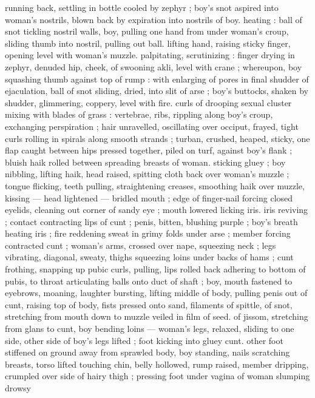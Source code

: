 {running back, settling in bottle cooled by zephyr ; boy's snot aspired 
into woman's nostrils, blown back by expiration into nostrils of boy. 
heating : ball of snot tickling nostril walls, boy, pulling one hand from 
under woman's croup, sliding thumb into nostril, pulling out ball. 
lifting hand, raising sticky finger, opening level with woman's muzzle. 
palpitating, scrutinizing : finger drying in zephyr, denuded hip, 
cheek, of swooning akli, level with crane ; whereupon, boy squashing 
thumb against top of rump : with enlarging of pores in final shudder 
of ejaculation, ball of snot sliding, dried, into slit of arse ; boy's 
buttocks, shaken by shudder, glimmering, coppery, level with fire. 
curls of drooping sexual cluster mixing with blades of grass : 
vertebrae, ribs, rippling along boy's croup, exchanging perspiration 
; hair unravelled, oscillating over occiput, frayed, tight curls rolling in 
spirals along smooth strands ; turban, crushed, heaped, sticky, one 
flap caught between hips pressed together, piled on turf, against 
boy's flank ; bluish haik rolled between spreading breasts of woman. 
sticking gluey ; boy nibbling, lifting haik, head raised, spitting cloth 
back over woman's muzzle ; tongue flicking, teeth pulling, 
straightening creases, smoothing haik over muzzle, kissing --- head 
lightened --- bridled mouth ; edge of finger-nail forcing closed 
eyelids, cleaning out corner of sandy eye ; mouth lowered licking iris. 
iris reviving ; contact contracting lips of cunt ; penis, bitten, blushing 
purple ; boy's breath heating iris ; fire reddening sweat in grimy folds 
under arse ; member forcing contracted cunt ; woman's arms, 
crossed over nape, squeezing neck ; legs vibrating, diagonal, sweaty, 
thighs squeezing loins under backs of hams ; cunt frothing, snapping 
up pubic curls, pulling, lips rolled back adhering to bottom of pubis, 
to throat articulating balls onto duct of shaft ; boy, mouth fastened 
to eyebrows, moaning, laughter bursting, lifting middle of body, 
pulling penis out of cunt, raising top of body, fists pressed onto 
sand, filaments of spittle, of snot, stretching from mouth down to 
muzzle veiled in film of seed. of jissom, stretching from glans to 
cunt, boy bending loins --- woman's legs, relaxed, sliding to one 
side, other side of boy's legs lifted ; foot kicking into gluey cunt. 
other foot stiffened on ground away from sprawled body, boy 
standing, nails scratching breasts, torso lifted touching chin, belly 
hollowed, rump raised, member dripping, crumpled over side of 
hairy thigh ; pressing foot under vagina of woman slumping drowsy 
}
